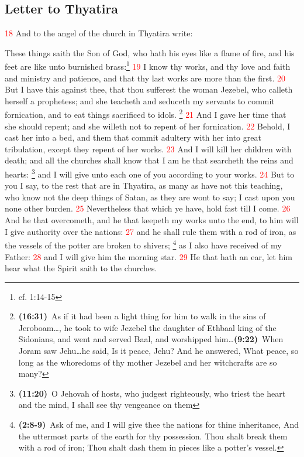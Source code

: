 \documentclass[12pt,twoside]{memoir}
\newcommand{\cbibleref}[3]{\textbf{\ibibleverse[textit]{#1}(#2)}\ {#3}}
\newcommand{\cbiblefoot}[3]{\footnote{\cbibleref{#1}{#2}{#3}}}
\newcommand{\cbiblefootduo}[6]{\footnote{\cbibleref{#1}{#2}{#3}\ldots \cbibleref{#4}{#5}{#6}}}
\newcommand{\vnum}[1]{\textcolor{red}{\normalsize{#1}}}
\begin{document}
\subsection*{Letter to Thyatira}
\vnum{18} And to the angel of the church in Thyatira write:

These things saith the Son of God, who hath his eyes like a flame of fire, and his feet are like unto burnished brass:\footnote{cf. 1:14-15} %
\vnum{19} I know thy works, and thy love and faith and ministry and patience, and that thy last works are more than the first. %
\vnum{20} But I have this against thee, that thou sufferest the woman Jezebel, who calleth herself a prophetess; and she teacheth and seduceth my servants to commit fornication, and to eat things sacrificed to idols.%
	\cbiblefootduo{IKings}{16:31}{As if it had been a light thing for him to walk in the sins of Jeroboam\ldots, he took to wife Jezebel the daughter of Ethbaal king of the Sidonians, and went and served Baal, and worshipped him}%
				 {IIKings}{9:22}{When Joram saw Jehu\ldots he said, Is it peace, Jehu? And he answered, What peace, so long as the whoredoms of thy mother Jezebel and her witchcrafts are so many?}
\vnum{21} And I gave her time that she should repent; and she willeth not to repent of her fornication. %
\vnum{22} Behold, I cast her into a bed, and them that commit adultery with her into great tribulation, except they repent of her works. %
\vnum{23} And I will kill her children with death; and all the churches shall know that I am he that searcheth the reins and hearts:%
	\cbiblefoot{Jeremiah}{11:20}{O Jehovah of hosts, who judgest righteously, who triest the heart and the mind, I shall see thy vengeance on them}
 and I will give unto each one of you according to your works. %
\vnum{24} But to you I say, to the rest that are in Thyatira, as many as have not this teaching, who know not the deep things of Satan, as they are wont to say; I cast upon you none other burden. %
\vnum{25} Nevertheless that which ye have, hold fast till I come. %
\vnum{26} And he that overcometh, and he that keepeth my works unto the end, to him will I give authority over the nations: %
\vnum{27} and he shall rule them with a rod of iron, as the vessels of the potter are broken to shivers;%
	\cbiblefoot{Psalms}{2:8-9}{Ask of me, and I will give thee the nations for thine inheritance, And the uttermost parts of the earth for thy possession. Thou shalt break them with a rod of iron; Thou shalt dash them in pieces like a potter’s vessel.}
 as I also have received of my Father: %
\vnum{28} and I will give him the morning star. %
\vnum{29} He that hath an ear, let him hear what the Spirit saith to the churches.
\end{document}
